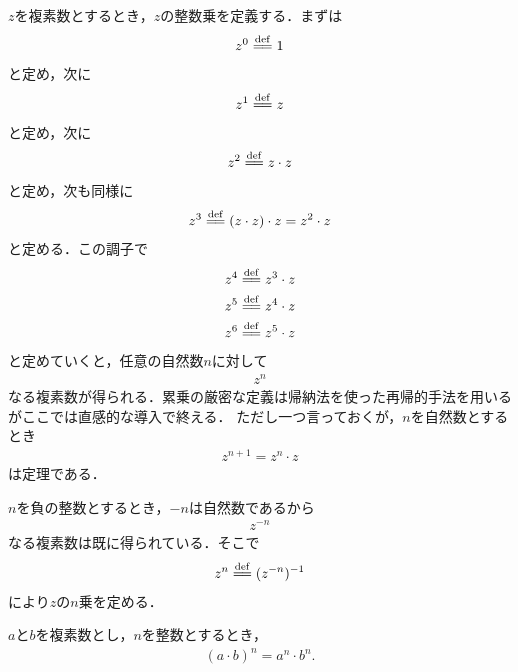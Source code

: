 	$z$を複素数とするとき，$z$の整数乗を定義する．まずは
	\begin{align}
		z^0 \defeq 1
	\end{align}
	と定め，次に
	\begin{align}
		z^1 \defeq z
	\end{align}
	と定め，次に
	\begin{align}
		z^2 \defeq z \cdot z
	\end{align}
	と定め，次も同様に
	\begin{align}
		z^3 \defeq (z \cdot z) \cdot z = z^2 \cdot z
	\end{align}
	と定める．この調子で
	\begin{align}
		z^4 &\defeq z^3 \cdot z \\
		z^5 &\defeq z^4 \cdot z \\
		z^6 &\defeq z^5 \cdot z \\
	\end{align}
	と定めていくと，任意の自然数$n$に対して
	\begin{align}
		z^n
	\end{align}
	なる複素数が得られる．累乗の厳密な定義は帰納法を使った再帰的手法を用いるがここでは直感的な導入で終える．
	ただし一つ言っておくが，$n$を自然数とするとき
	\begin{align}
		z^{n+1} = z^n \cdot z
	\end{align}
	は定理である．
	
	$n$を負の整数とするとき，$-n$は自然数であるから
	\begin{align}
		z^{-n}
	\end{align}
	なる複素数は既に得られている．そこで
	\begin{align}
		z^n \defeq (z^{-n})^{-1}
		\label{fom:def_of_integer_exponentiation}
	\end{align}
	により$z$の$n$乗を定める．
	
	\begin{screen}
		\begin{thm}[積の累乗は累乗の積]
		\label{thm:law_of_exponentiation_for_multiplication}
			$a$と$b$を複素数とし，$n$を整数とするとき，
			\begin{align}
				(a \cdot b)^n = a^n \cdot b^n.
			\end{align}
		\end{thm}
	\end{screen}
	
